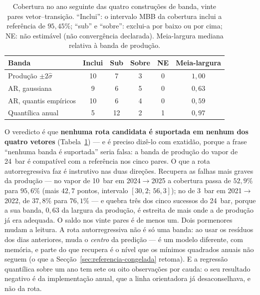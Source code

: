 \begin{table}[htbp]
  \centering
  \caption[Bandas alternativas nos vinte pares]{Cobertura no ano seguinte
  das quatro construções de banda, vinte pares vetor--transição. ``Inclui'':
  o intervalo MBB da cobertura inclui a referência de $95{,}45\%$; ``sub'' e
  ``sobre'': exclui-a por baixo ou por cima; NE: não estimável (não
  convergência declarada). Meia-largura mediana relativa à banda de
  produção.}
  \label{tab:bandas}
  \begin{tabular}{lccccc}
    \toprule
    Banda & Inclui & Sub & Sobre & NE & Meia-largura \\
    \midrule
    Produção $\pm 2\hat\sigma$   & 10 & 7  & 3 & 0 & $1{,}00$ \\
    AR, gaussiana                & 9  & 6  & 5 & 0 & $0{,}63$ \\
    AR, quantis empíricos        & 10 & 6  & 4 & 0 & $0{,}59$ \\
    Quantílica anual             & 5  & 12 & 2 & 1 & $0{,}97$ \\
    \bottomrule
  \end{tabular}
\end{table}

O veredicto é que \textbf{nenhuma rota candidata é suportada em nenhum dos
quatro vetores} (Tabela~\ref{tab:bandas}) --- e é preciso dizê-lo com
exatidão, porque a frase ``nenhuma banda é suportada'' seria falsa: a banda
de produção do vapor de 24~bar é compatível com a referência nos cinco pares.
O que a rota autorregressiva faz é instrutivo nas duas direções. Recupera
as falhas mais graves da produção --- no vapor de 10~bar em 2024${\to}$2025
a cobertura passa de $52{,}9\%$ para $95{,}6\%$ (mais $42{,}7$ pontos,
intervalo $[30{,}2;\,56{,}3]$); no de 3~bar em 2021${\to}$2022, de $37{,}8\%$
para $76{,}1\%$ --- e quebra três dos cinco sucessos do 24~bar, porque a sua
banda, $0{,}63$ da largura da produção, é estreita de mais onde a de
produção já era adequada. O saldo nos vinte pares é de menos um. Dois
pormenores mudam a leitura. A rota autorregressiva não é só uma banda: ao
usar os resíduos dos dias anteriores, muda o \emph{centro} da predição ---
é um modelo diferente, com memória, e parte do que recupera é o nível que os
mínimos quadrados anuais não seguem (o que a Secção~\ref{sec:referencia-congelada}
retoma). E a regressão quantílica sobre um ano tem sete ou oito observações
por cauda: o seu resultado negativo é da implementação anual, que a linha
orientadora já desaconselhava, e não da rota.

